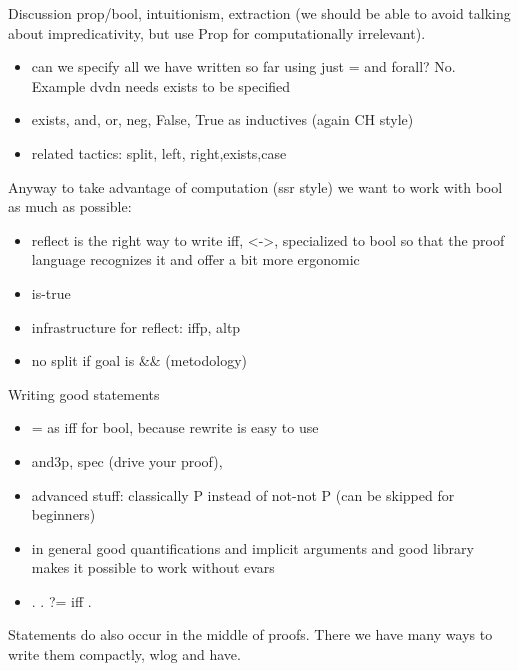 %

Discussion prop/bool, intuitionism, extraction (we should be able to avoid talking about impredicativity, but use Prop for computationally irrelevant).

\begin{itemize}
\item can we specify all we have written so far using just = and forall? No.
	Example dvdn needs exists to be specified
\item exists, and, or, neg, False, True as inductives (again CH style)
\item related tactics: split, left, right,exists,case
\end{itemize}

Anyway to take advantage of computation (ssr style) we want to
work with bool as much as possible:

\begin{itemize}
\item reflect is the right way to write iff, <->, specialized to bool
	so that the proof language recognizes it and offer a bit more ergonomic
\item is-true
\item infrastructure for reflect: iffp, altp
\item no split if goal is \&\& (metodology)
\end{itemize}

Writing good statements

\begin{itemize}
\item = as iff for bool, because rewrite is easy to use
\item and3p, spec (drive your proof),
\item advanced stuff: classically P instead of not-not P (can be
  skipped for beginners)
\item in general good quantifications and implicit arguments and good library
	makes it possible to work without evars
\item . \C{<=} . ?= iff .
\end{itemize}

Statements do also occur in the middle of proofs.  There we have many ways to
write them compactly, wlog and have.

